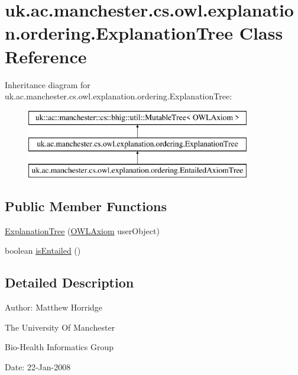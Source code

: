 \hypertarget{classuk_1_1ac_1_1manchester_1_1cs_1_1owl_1_1explanation_1_1ordering_1_1_explanation_tree}{\section{uk.\-ac.\-manchester.\-cs.\-owl.\-explanation.\-ordering.\-Explanation\-Tree Class Reference}
\label{classuk_1_1ac_1_1manchester_1_1cs_1_1owl_1_1explanation_1_1ordering_1_1_explanation_tree}
}
Inheritance diagram for uk.\-ac.\-manchester.\-cs.\-owl.\-explanation.\-ordering.\-Explanation\-Tree\-:\begin{figure}[H]
\begin{center}
\leavevmode
\includegraphics[height=3.000000cm]{classuk_1_1ac_1_1manchester_1_1cs_1_1owl_1_1explanation_1_1ordering_1_1_explanation_tree}
\end{center}
\end{figure}
\subsection*{Public Member Functions}
\begin{DoxyCompactItemize}
\item 
\hyperlink{classuk_1_1ac_1_1manchester_1_1cs_1_1owl_1_1explanation_1_1ordering_1_1_explanation_tree_a9bc3390ca4a91fdbf0b6e2d5fbf76b60}{Explanation\-Tree} (\hyperlink{interfaceorg_1_1semanticweb_1_1owlapi_1_1model_1_1_o_w_l_axiom}{O\-W\-L\-Axiom} user\-Object)
\item 
boolean \hyperlink{classuk_1_1ac_1_1manchester_1_1cs_1_1owl_1_1explanation_1_1ordering_1_1_explanation_tree_ac6cef86db211a78b251f0a2d780fed23}{is\-Entailed} ()
\end{DoxyCompactItemize}


\subsection{Detailed Description}
Author\-: Matthew Horridge\par
 The University Of Manchester\par
 Bio-\/\-Health Informatics Group\par
 Date\-: 22-\/\-Jan-\/2008\par
\par
 

